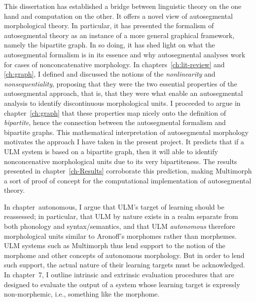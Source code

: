 This dissertation has established a bridge between linguistic theory 
on the one hand and computation on the other. 
It offers a novel view of autosegmental morphological theory. 
In particular, it has presented the formalism of autosegmental theory
as an instance of a more general graphical framework, namely 
the bipartite graph. In so doing, it has shed light on what the autosegmental formalism is in 
its essence and why autosegmental analyses work for 
cases of nonconcatenative morphology. 
In chapters~\ref{ch:lit-review} and \ref{ch:graph}, I
defined and discussed the notions of the \emph{nonlinearity} 
and \emph{nonsequentiality}, proposing that they were the 
two essential properties of the autosegmental approach, 
that is, that they were what enable an autosegmental
analysis to identify discontinuous morphological units. 
I proceeded to argue in chapter~\ref{ch:graph} that these
properties map nicely onto the definition of \emph{bipartite}, 
hence the connection between the autosegmental formalism and bipartite graphs.
This mathematical interpretation of autosegmental morphology 
motivates the approach I have taken in the present project. 
It predicts that if a ULM system is based on a bipartite graph, then 
it will able to identify nonconcenative morphological
units due to its very bipartiteness. The results presented in chapter~\ref{ch-Results} 
 corroborate this prediction, making 
 Multimorph a sort of proof of concept for the 
 computational implementation of autosegmental 
 theory.

In chapter~{autonomous}, I argue that ULM's target of learning should be reassessed; in particular, that ULM by nature
exists in a realm separate from both phonology and syntax/semantics, and that ULM \emph{autonomous} therefore morphological units similar to Aronoff's morphomes \citep{aronoff:1994} rather than morphemes. ULM systems such as 
Multimorph thus lend support to the notion of the morphome and other concepts of autonomous 
morphology. But in order to lend such support, the actual nature of their learning targets must 
be acknowledged. In chapter~7, I outline intrinsic and extrinsic evaluation procedures that are 
designed to evaluate the output of a system whose learning target is expressly 
non-morphemic, i.e., something like the morphome.


